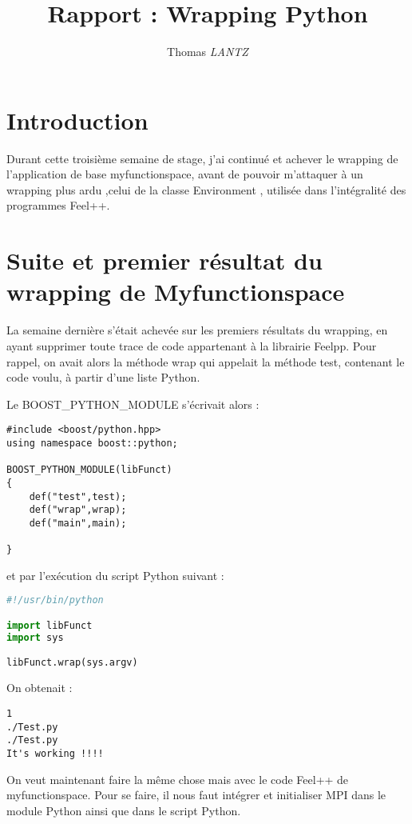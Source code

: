 \documentclass[12pt]{article}
\title {Rapport : Wrapping Python}
\author {Thomas \emph{LANTZ}}
\begin{document}
\maketitle 

\section{Introduction}

Durant cette troisième semaine de stage, j'ai continué et achever le wrapping de l'application de base myfunctionspace, avant de pouvoir m'attaquer à un wrapping plus ardu ,celui de la classe Environment , utilisée dans l'intégralité des programmes Feel++.

\section{Suite et premier résultat du wrapping de Myfunctionspace }

La semaine dernière s'était achevée sur les premiers résultats du wrapping, en ayant supprimer toute trace de code appartenant à la librairie Feelpp. Pour rappel, on avait alors la méthode wrap qui appelait la méthode test, contenant le code voulu, à partir d'une liste Python.
 
 Le BOOST\_PYTHON\_MODULE s'écrivait alors :
 
\begin{lstlisting}
#include <boost/python.hpp>
using namespace boost::python;

BOOST_PYTHON_MODULE(libFunct)
{
    def("test",test); 
    def("wrap",wrap);
    def("main",main);
   
}
\end{lstlisting}

et par l'exécution du script Python suivant :

\begin{lstlisting}[language=Python]
#!/usr/bin/python

import libFunct
import sys

libFunct.wrap(sys.argv)
\end{lstlisting}

On obtenait  :
\begin{verbatim}
1
./Test.py
./Test.py
It's working !!!!
\end{verbatim}

On veut maintenant faire la même chose mais avec le code Feel++ de myfunctionspace.
Pour se faire, il nous faut intégrer et initialiser MPI dans le module Python ainsi que dans le script Python.\\
\end{document}
